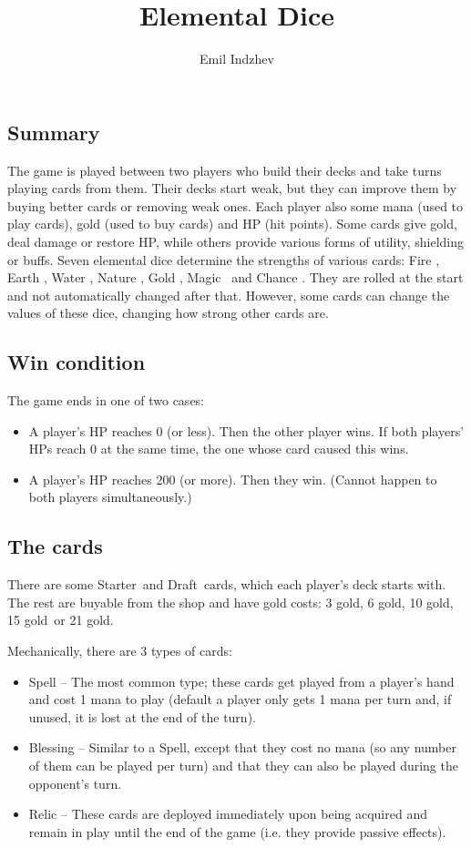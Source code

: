 \documentclass[dvipsnames,parskip,a4paper]{scrartcl}
\date{}
\title{Elemental Dice}
\author{Emil Indzhev}
\newcommand{\iconsize}{3.4mm}
\newcommand{\icondepth}{0.45mm}
\newcommand{\icon}[1]{\raisebox{-\icondepth}{\texttt{[image:  \#1 ]}}}
\newcommand{\fire}{\icon{icons/fire.png}}
\newcommand{\earth}{\icon{icons/earth.png}}
\newcommand{\water}{\icon{icons/water.png}}
\newcommand{\nature}{\icon{icons/nature.png}}
\newcommand{\magic}{\icon{icons/magic.png}}
\newcommand{\gold}{\icon{icons/gold.png}}
\newcommand{\chance}{\icon{icons/chance.png}}
\newcommand{\starter}{Starter}
\newcommand{\draft}{Draft}
\newcommand{\onecost}{3 gold}
\newcommand{\twocost}{6 gold}
\newcommand{\threecost}{10 gold}
\newcommand{\fourcost}{15 gold}
\newcommand{\fivecost}{21 gold}
\begin{document}

\subsection*{Summary}

The game is played between two players who build their decks and take turns playing cards from them. Their decks start weak, but they can improve them by buying better cards or removing weak ones. Each player also some mana (used to play cards), gold (used to buy cards) and HP (hit points). Some cards give gold, deal damage or restore HP, while others provide various forms of utility, shielding or buffs. Seven elemental dice determine the strengths of various cards: Fire \fire, Earth \earth, Water \water, Nature \nature, Gold \gold, Magic \magic \ and Chance \chance. They are rolled at the start and not automatically changed after that. However, some cards can change the values of these dice, changing how strong other cards are.

\subsection*{Win condition}

The game ends in one of two cases:

\begin{itemize}
\item A player's HP reaches 0 (or less). Then the other player wins. If both players' HPs reach 0 at the same time, the one whose card caused this wins.
\item A player's HP reaches 200 (or more). Then they win. (Cannot happen to both players simultaneously.)
\end{itemize}

\subsection*{The cards}

There are some \starter \ and \draft \ cards, which each player's deck starts with. The rest are buyable from the shop and have gold costs: \onecost, \twocost, \threecost, \fourcost \ or \fivecost.

Mechanically, there are 3 types of cards:

\begin{itemize}
\item Spell -- The most common type; these cards get played from a player's hand and cost 1 mana to play (default a player only gets 1 mana per turn and, if unused, it is lost at the end of the turn).
\item Blessing -- Similar to a Spell, except that they cost no mana (so any number of them can be played per turn) and that they can also be played during the opponent's turn.
\item Relic -- These cards are deployed immediately upon being acquired and remain in play until the end of the game (i.e. they provide passive effects).
\end{itemize}
\end{document}
